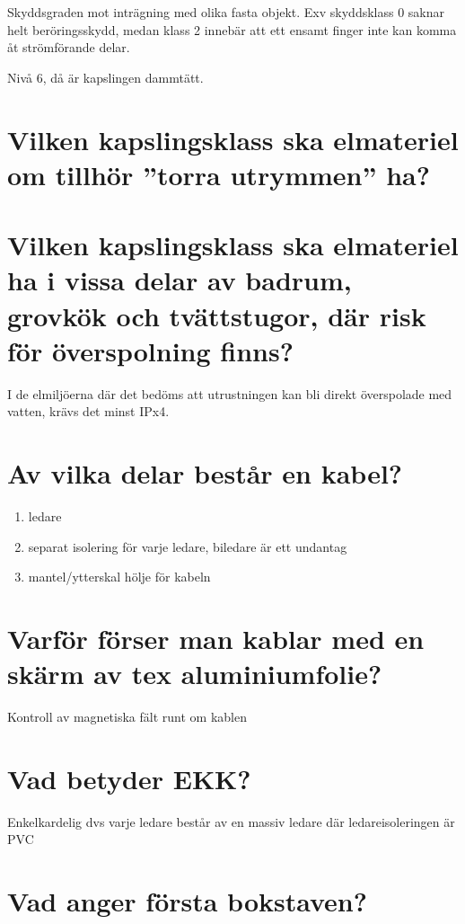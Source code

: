 \documentclass[a4paper,swedish]{article}
\begin{document}
Skyddsgraden mot inträgning med olika fasta objekt. Exv skyddsklass 0 saknar helt beröringsskydd,
medan klass 2 innebär att ett ensamt finger inte kan komma åt strömförande delar.

Nivå 6, då är kapslingen dammtätt.

\setcounter{section}{6}
\section{Vilken kapslingsklass ska elmateriel om tillhör ”torra utrymmen” ha?}


\setcounter{section}{8}
\section{Vilken kapslingsklass ska elmateriel ha i vissa delar av badrum, grovkök och
  tvättstugor, där risk för överspolning finns?}

I de elmiljöerna där det bedöms att utrustningen kan bli direkt överspolade med vatten, krävs det minst IPx4.

\setcounter{section}{10}
\section{Av vilka delar består en kabel?}

\begin{enumerate}
\item ledare
\item separat isolering för varje ledare, biledare är ett undantag
\item mantel/ytterskal hölje för kabeln
\end{enumerate}

\setcounter{section}{12}
\section{Varför förser man kablar med en skärm av tex aluminiumfolie?}

Kontroll av magnetiska fält runt om kablen

\setcounter{section}{14}
\section{Vad betyder EKK?}

Enkelkardelig dvs varje ledare består av en massiv ledare där ledareisoleringen är PVC

\setcounter{section}{16}
\section{Vad anger första bokstaven?}
\end{document}
